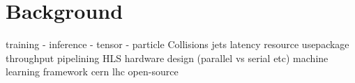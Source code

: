 \chapter{Background}

training - 
inference - 
tensor -
particle Collisions 
jets
latency
resource usepackage
throughput
pipelining
HLS
hardware design (parallel vs serial etc)
machine learning framework
cern
lhc
open-source